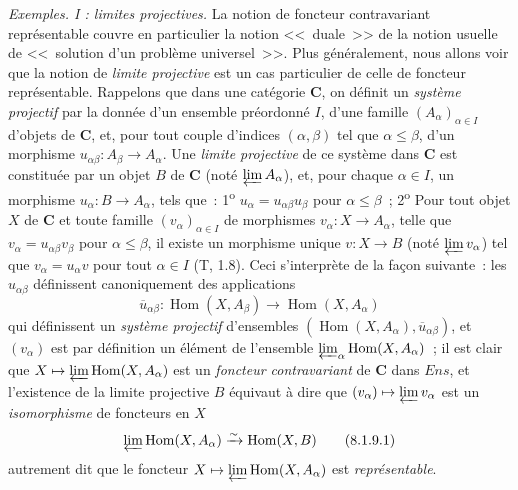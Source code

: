 \begin{env}[8.1.9]
\label{0.8.1.9-fr}
\textit{Exemples. I : limites projectives.} La notion de foncteur
contravariant représentable couvre en particulier la notion <<~duale~>> de
la notion usuelle de <<~solution d'un
problème universel~>>. Plus généralement, nous allons voir que la notion de
\emph{limite projective} est un cas particulier de celle de foncteur
représentable. Rappelons que dans une catégorie $\boldsymbol{C}$, on définit un
\emph{système projectif} par la donnée d'un ensemble préordonné $I$, d'une
famille $(A_\alpha)_{\alpha\in I}$ d'objets de $\boldsymbol{C}$, et, pour tout couple
d'indices $(\alpha,\beta)$ tel que $\alpha\leq\beta$, d'un morphisme
$u_{\alpha\beta}:A_\beta\to A_\alpha$. Une \emph{limite projective} de ce
système dans $\boldsymbol{C}$ est constituée par un objet $B$ de $\boldsymbol{C}$ (noté
$\varprojlim A_\alpha$), et, pour chaque $\alpha\in I$, un morphisme
$u_\alpha:B\to A_\alpha$, tels que~: 1\textsuperscript{o}
$u_\alpha=u_{\alpha\beta}u_\beta$ pour $\alpha\leq\beta$~;
2\textsuperscript{o} Pour tout objet $X$ de $\boldsymbol{C}$ et toute famille
$(v_\alpha)_{\alpha\in I}$ de morphismes $v_\alpha:X\to A_\alpha$, telle
que $v_\alpha=u_{\alpha\beta}v_\beta$ pour $\alpha\leq\beta$, il existe un
morphisme unique $v:X\to B$ (noté $\varprojlim v_\alpha$) tel que
$v_\alpha=u_\alpha v$ pour tout $\alpha\in I$ (T, 1.8). Ceci s'interprète de
la façon suivante~: les $u_{\alpha\beta}$ définissent canoniquement des
applications
\[
  \overline{u}_{\alpha\beta}:\operatorname{Hom}(X,A_\beta)
  \to\operatorname{Hom}(X,A_\alpha)
\]
qui définissent un \emph{système projectif} d'ensembles
$(\operatorname{Hom}(X,A_\alpha),\overline{u}_{\alpha\beta})$, et
$(v_\alpha)$ est par définition un élément de l'ensemble
$\varprojlim_\alpha\operatorname{Hom}(X,A_\alpha)$~; il est clair que
$X\mapsto\varprojlim\operatorname{Hom}(X,A_\alpha)$ est un
\emph{foncteur contravariant} de $\boldsymbol{C}$ dans $\boldsymbol{\mathit{Ens}}$, et l'existence de
la limite projective $B$ équivaut à dire que
$(v_\alpha)\mapsto\varprojlim v_\alpha$ est un \emph{isomorphisme} de
foncteurs en $X$
\[
  \varprojlim\operatorname{Hom}(X,A_\alpha)
  \xrightarrow{\sim}\operatorname{Hom}(X,B)
  \tag{8.1.9.1}
\]
autrement dit que le foncteur
$X\mapsto\varprojlim\operatorname{Hom}(X,A_\alpha)$ est
\emph{représentable}.
\end{env}

